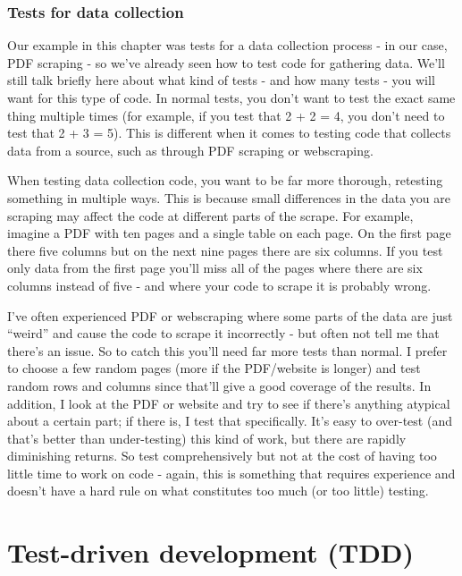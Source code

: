 \documentclass[
]{krantz}
\begin{document}
\hypertarget{tests-for-data-collection}{%
\subsubsection{Tests for data
collection}\label{tests-for-data-collection}}

Our example in this chapter was tests for a data collection
process - in our case, PDF scraping - so we've already seen
how to test code for gathering data. We'll still talk
briefly here about what kind of tests - and how many tests -
you will want for this type of code. In normal tests, you
don't want to test the exact same thing multiple times (for
example, if you test that 2 + 2 = 4, you don't need to test
that 2 + 3 = 5). This is different when it comes to testing
code that collects data from a source, such as through PDF
scraping or webscraping.

When testing data collection code, you want to be far more
thorough, retesting something in multiple ways. This is
because small differences in the data you are scraping may
affect the code at different parts of the scrape. For
example, imagine a PDF with ten pages and a single table on
each page. On the first page there five columns but on the
next nine pages there are six columns. If you test only data
from the first page you'll miss all of the pages where there
are six columns instead of five - and where your code to
scrape it is probably wrong.

I've often experienced PDF or webscraping where some parts
of the data are just ``weird'' and cause the code to scrape
it incorrectly - but often not tell me that there's an
issue. So to catch this you'll need far more tests than
normal. I prefer to choose a few random pages (more if the
PDF/website is longer) and test random rows and columns
since that'll give a good coverage of the results. In
addition, I look at the PDF or website and try to see if
there's anything atypical about a certain part; if there is,
I test that specifically. It's easy to over-test (and that's
better than under-testing) this kind of work, but there are
rapidly diminishing returns. So test comprehensively but not
at the cost of having too little time to work on code -
again, this is something that requires experience and
doesn't have a hard rule on what constitutes too much (or
too little) testing.

\hypertarget{test-driven-development-tdd}{%
\section{Test-driven development
(TDD)}\label{test-driven-development-tdd}}
\end{document}
